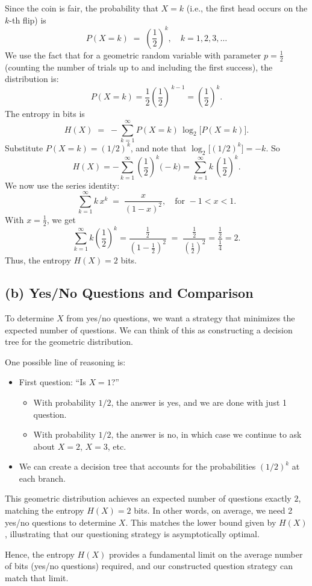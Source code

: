 \documentclass{article}
\begin{document}
Since the coin is fair, the probability that $X = k$ (i.e., the first head occurs on the $k$-th flip) is
\[
P(X = k) \;=\; \left(\frac12\right)^k,
\quad k = 1,2,3,\ldots
\]
We use the fact that for a geometric random variable with parameter $p=\tfrac12$ (counting the number of trials up to and including the first success), the distribution is:
\[
P(X = k) = \frac12 \left(\frac12\right)^{\,k-1} = \left(\frac12\right)^k.
\]
The entropy in bits is
\[
H(X) \;=\; - \sum_{k=1}^{\infty} P(X=k)\,\log_2 \bigl[P(X=k)\bigr].
\]
Substitute $P(X=k) = (1/2)^k$, and note that $\log_2 \bigl[ (1/2)^k \bigr] = -k$. So
\[
H(X)
= - \sum_{k=1}^{\infty} \left(\frac12\right)^k \bigl(-k\bigr)
= \sum_{k=1}^{\infty} k \,\left(\frac12\right)^k.
\]
We now use the series identity:
\[
\sum_{k=1}^{\infty} k \,x^k \;=\; \frac{x}{(1-x)^2}, 
\quad \text{for } -1 < x < 1.
\]
With $x = \tfrac12$, we get
\[
\sum_{k=1}^{\infty} k \left(\frac12\right)^k
= \frac{\tfrac12}{(1 - \tfrac12)^2} \;=\; \frac{\tfrac12}{(\tfrac12)^2} 
= \frac{\tfrac12}{\tfrac14} 
= 2.
\]
Thus, the entropy $H(X) = 2$ bits.

\subsection{(b) Yes/No Questions and Comparison}

To determine $X$ from yes/no questions, we want a strategy that minimizes the expected number of questions. We can think of this as constructing a decision tree for the geometric distribution.

One possible line of reasoning is:
\begin{itemize}
    \item First question: ``Is $X=1$?'' 
        \begin{itemize}
        \item With probability $1/2$, the answer is yes, and we are done with just 1 question.
        \item With probability $1/2$, the answer is no, in which case we continue to ask about $X=2$, $X=3$, etc.
        \end{itemize}
    \item We can create a decision tree that accounts for the probabilities $(1/2)^k$ at each branch.
\end{itemize}
This geometric distribution achieves an expected number of questions exactly $2$, matching the entropy $H(X) = 2$ bits. In other words, on average, we need 2 yes/no questions to determine $X$. This matches the lower bound given by $H(X)$, illustrating that our questioning strategy is asymptotically optimal.

Hence, the entropy $H(X)$ provides a fundamental limit on the average number of bits (yes/no questions) required, and our constructed question strategy can match that limit.
\end{document}
